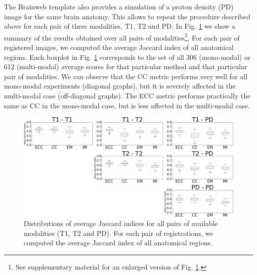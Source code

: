 The Brainweb template also provides a simulation of a proton density (PD) image for the same brain anatomy. This allows to repeat the procedure described above for each pair of three modalities, T1, T2 and PD. In Fig. \ref{fig:all_pairs_boxplots} we show a summary of the results obtained over all pairs of modalities\footnote{See supplementary material for an enlarged version of Fig. \ref{fig:all_pairs_boxplots}.}. For each pair of registered images, we computed the average Jaccard index of all anatomical regions. Each boxplot in Fig. \ref{fig:all_pairs_boxplots} corresponds to the set of all 306 (mono-modal) or 612 (multi-modal) average scores for that particular method and that particular pair of modalities. We can observe that the CC metric performs very well for all mono-modal experiments (diagonal graphs), but it is severely affected in the multi-modal case (off-diagonal graphs). The ECC metric performs practically the same as CC in the mono-modal case, but is less affected in the multi-modal case.
%
%



\begin{figure}[t!]
\centering
    \includegraphics[width=\linewidth]{images/all_modality_pairs_boxplots.png}
    \caption{{\small Distributions of average Jaccard indices for all pairs of available modalities (T1, T2 and PD). For each pair of registrations, we computed the average Jaccard index of all anatomical regions.}}
\label{fig:all_pairs_boxplots}\figcloser
\end{figure}

